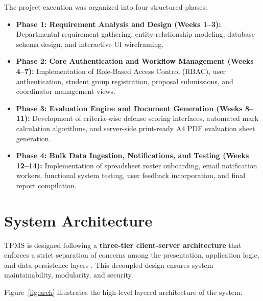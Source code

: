 \documentclass[12pt,a4paper]{report}
\begin{document}
The project execution was organized into four structured phases:
\begin{itemize}
  \item \textbf{Phase 1: Requirement Analysis and Design (Weeks 1--3):} Departmental requirement gathering, entity-relationship modeling, database schema design, and interactive UI wireframing.
  
  \item \textbf{Phase 2: Core Authentication and Workflow Management (Weeks 4--7):} Implementation of Role-Based Access Control (RBAC), user authentication, student group registration, proposal submissions, and coordinator management views.
  
  \item \textbf{Phase 3: Evaluation Engine and Document Generation (Weeks 8--11):} Development of criteria-wise defense scoring interfaces, automated mark calculation algorithms, and server-side print-ready A4 PDF evaluation sheet generation.
  
  \item \textbf{Phase 4: Bulk Data Ingestion, Notifications, and Testing (Weeks 12--14):} Implementation of spreadsheet roster onboarding, email notification workers, functional system testing, user feedback incorporation, and final report compilation.
\end{itemize}

\section{System Architecture}
TPMS is designed following a \textbf{three-tier client-server architecture} that enforces a strict separation of concerns among the presentation, application logic, and data persistence layers \cite{martin2017clean}. This decoupled design ensures system maintainability, modularity, and security.

Figure~\ref{fig:arch} illustrates the high-level layered architecture of the system:
\end{document}
